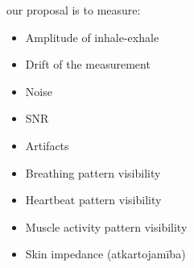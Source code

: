 our proposal is to measure:
\begin{itemize}
    \item Amplitude of inhale-exhale
    \item Drift of the measurement
    \item Noise
    \item SNR
    \item Artifacts
    \item Breathing pattern visibility
    \item Heartbeat pattern visibility
    \item Muscle activity pattern visibility
    \item Skin impedance (atkartojamība)
\end{itemize}






